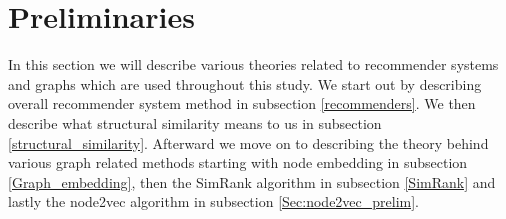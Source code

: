 \section{Preliminaries}\label{preliminaries}
In this section we will describe various theories related to recommender systems and graphs which are used throughout this study. We start out by describing overall recommender system method in subsection \ref{recommenders}. We then describe what structural similarity means to us in subsection \ref{structural_similarity}. Afterward we move on to describing the theory behind various graph related methods starting with node embedding in subsection \ref{Graph_embedding}, then the SimRank algorithm in subsection \ref{SimRank} and lastly the node2vec algorithm in subsection \ref{Sec:node2vec_prelim}.








